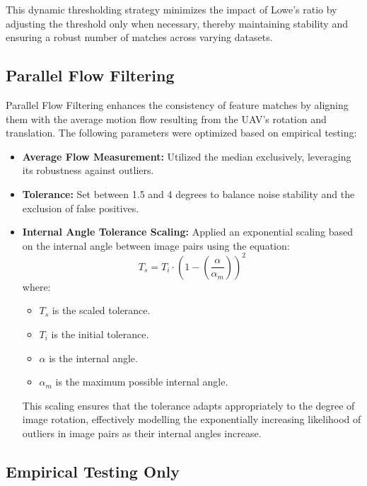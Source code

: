 \begin{itemize}
This dynamic thresholding strategy minimizes the impact of Lowe's ratio by adjusting the threshold only when necessary, thereby maintaining stability and ensuring a robust number of matches across varying datasets.

\subsection{Parallel Flow Filtering}

Parallel Flow Filtering enhances the consistency of feature matches by aligning them with the average motion flow resulting from the UAV's rotation and translation. The following parameters were optimized based on empirical testing:

\begin{itemize}
    \item \textbf{Average Flow Measurement:} Utilized the median exclusively, leveraging its robustness against outliers.
    \item \textbf{Tolerance:} Set between 1.5 and 4 degrees to balance noise stability and the exclusion of false positives.
    \item \textbf{Internal Angle Tolerance Scaling:} Applied an exponential scaling based on the internal angle between image pairs using the equation:
    \begin{equation*}
        T_s = T_i \cdot \left(1 - \left(\frac{\alpha}{\alpha_m}\right)\right)^2
    \end{equation*}
    where:
    \begin{itemize}
        \item $T_s$ is the scaled tolerance.
        \item $T_i$ is the initial tolerance.
        \item $\alpha$ is the internal angle.
        \item $\alpha_m$ is the maximum possible internal angle.
    \end{itemize}
    This scaling ensures that the tolerance adapts appropriately to the degree of image rotation, effectively modelling the exponentially increasing likelihood of outliers in image pairs as their internal angles increase.
\end{itemize}

\subsection*{\textbf{Empirical Testing Only}}


\end{itemize}
